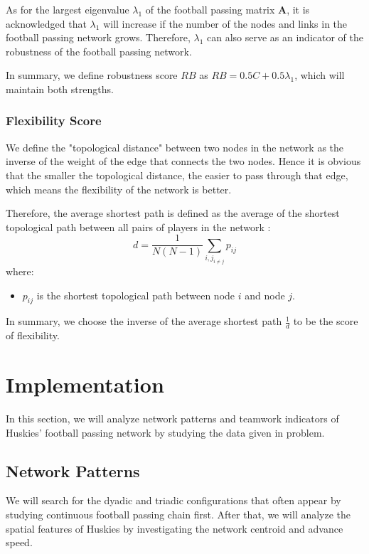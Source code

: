 \documentclass{mcmthesis}
\begin{document}
	As for the largest eigenvalue $\lambda_{1}$ of the football passing matrix $\textbf{A}$, it is acknowledged that $\lambda_{1}$ will increase if the number of the nodes and links in the football passing network grows.  Therefore, $\lambda_{1}$ can also serve as an indicator of the robustness of the football passing network.

	In summary, we define robustness score $RB$ as $RB = 0.5C + 0.5\lambda_{1}$, which will maintain both strengths.
\subsubsection{Flexibility Score}
	We define the "topological distance" between two nodes in the network as the inverse of the weight of the edge that connects the two nodes. Hence it is obvious that the smaller the topological distance, the easier to pass through that edge, which means the flexibility of the network is better. 
	
	Therefore, the average shortest path is defined as the average of the shortest topological path between all pairs of players in the network :
	\begin{equation}\label{eq:d}
		d = \frac{1}{N(N-1)} \sum_{i,j_{i \ne j}}p_{ij}
	\end{equation}
	where:
	\begin{itemize}
		\item 	$p_{ij}$ is the shortest topological path between node $i$ and node $j$.
	\end{itemize}

	In summary, we choose the inverse of the average shortest path $\frac{1}{d}$ to be the score of flexibility.
\section{Implementation}
	In this section, we will analyze network patterns and teamwork indicators of Huskies' football passing network by studying the data given in problem. 
\subsection{Network Patterns}
	We will search for the dyadic and triadic configurations that often appear by studying continuous football passing chain first.  After that, we will analyze the spatial features of Huskies by investigating the network centroid and advance speed.
\end{document}
